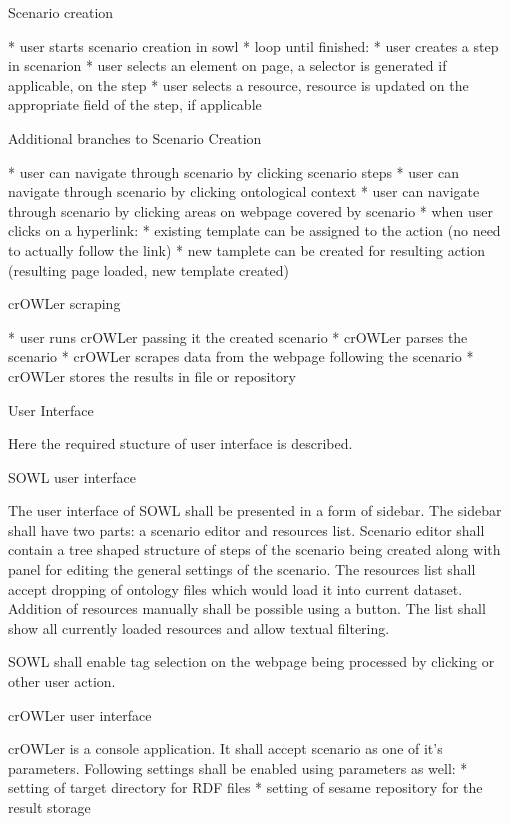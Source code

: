 \secc Scenario creation

\begitems
  * user starts scenario creation in sowl
  * loop until finished:
  \begitems
    * user creates a step in scenarion
    * user selects an element on page, a selector is generated if applicable,
      on the step
    * user selects a resource, resource is updated on the appropriate field of
      the step, if applicable
  \enditems
\enditems


\secc Additional branches to Scenario Creation

\begitems
  * user can navigate through scenario by clicking scenario steps
  * user can navigate through scenario by clicking ontological context
  * user can navigate through scenario by clicking areas on webpage covered by scenario
  * when user clicks on a hyperlink: 
  \begitems
    * existing template can be assigned to the action (no need to actually
      follow the link)
    * new tamplete can be created for resulting action (resulting page loaded,
      new template created)
  \enditems
\enditems

\secc crOWLer scraping

\begitems
  * user runs crOWLer passing it the created scenario
  * crOWLer parses the scenario
  * crOWLer scrapes data from the webpage following the scenario
  * crOWLer stores the results in file or repository
\enditems


\sec User Interface

Here the required stucture of user interface is described. 

\secc SOWL user interface

The user interface of SOWL shall be presented in a form of sidebar. The sidebar
shall have two parts: a scenario editor and resources list. Scenario editor
shall contain a tree shaped structure of steps of the scenario being created
along with panel for editing the general settings of the scenario. The
resources list shall accept dropping of ontology files which would load it into
current dataset. Addition of resources manually shall be possible using a
button. The list shall show all currently loaded resources and allow textual
filtering. 

SOWL shall enable tag selection on the webpage being processed by clicking or
other user action. 


\secc crOWLer user interface

crOWLer is a console application. It shall accept scenario as one of it's parameters. 
Following settings shall be enabled using parameters as well:
\begitems
  * setting of target directory for RDF files
  * setting of sesame repository for the result storage
\enditems


